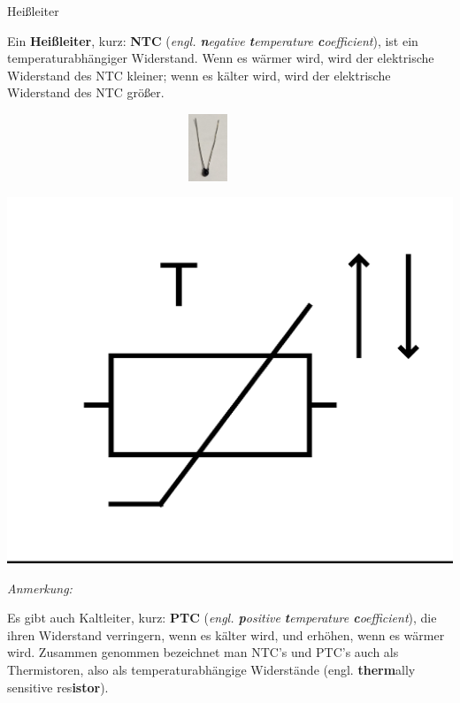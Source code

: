 \begin{zsfg}{Heißleiter}
	\begin{minipage}{0.7\textwidth}
		Ein \textbf{Heißleiter}, kurz: \textbf{NTC} (\emph{engl. \textbf{n}egative \textbf{t}emperature \textbf{c}oefficient}), ist ein temperaturabhängiger Widerstand. Wenn es wärmer wird, wird der elektrische Widerstand des NTC kleiner; wenn es kälter wird, wird der elektrische Widerstand des NTC größer.
	\end{minipage}
	\hfill
	\begin{minipage}{0.28\textwidth}
		\begin{minipage}{0.48\textwidth}
			\centering
			\includegraphics[width=0.9\textwidth, height=2cm]{./pics/ntc.jpg}
		\end{minipage}
		\hfill
		\begin{minipage}{0.48\textwidth}
			\centering
			\includegraphics[width=\textwidth]{./pics/ntc-schaltsymbol.png}
		\end{minipage}
	\end{minipage}
	
	\bigskip
	\emph{Anmerkung:}
	
	Es gibt auch Kaltleiter, kurz: \textbf{PTC} (\emph{engl. \textbf{p}ositive \textbf{t}emperature \textbf{c}oefficient}), die ihren Widerstand verringern, wenn es kälter wird, und erhöhen, wenn es wärmer wird. Zusammen genommen bezeichnet man NTC's und PTC's auch als Thermistoren, also als temperaturabhängige Widerstände (engl. \textbf{therm}ally sensitive res\textbf{istor}).
\end{zsfg}


